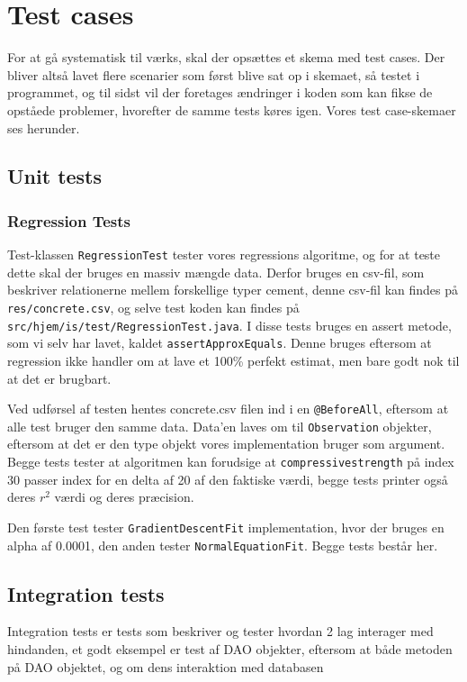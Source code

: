 \section{Test cases}
For at gå systematisk til værks, skal der opsættes et skema med test cases\cite{Heumann}. Der bliver altså lavet flere scenarier som først blive sat op i skemaet, så testet i programmet, og til sidst vil der foretages ændringer i koden som kan fikse de opståede problemer, hvorefter de samme tests køres igen. Vores test case-skemaer ses herunder.

\subsection{Unit tests}
\subsubsection{Regression Tests}
Test-klassen \texttt{RegressionTest} tester vores regressions algoritme, og for at teste dette skal der bruges en massiv mængde data. Derfor bruges en csv-fil, som beskriver relationerne mellem forskellige typer cement, denne csv-fil kan findes på \texttt{res/concrete.csv}, og selve test koden kan findes på \texttt{src/hjem/is/test/RegressionTest.java}. I disse tests bruges en assert metode, som vi selv har lavet, kaldet \texttt{assertApproxEquals}. Denne bruges eftersom at regression ikke handler om at lave et 100\% perfekt estimat, men bare godt nok til at det er brugbart.

Ved udførsel af testen hentes concrete.csv filen ind i en \texttt{@BeforeAll}, eftersom at alle test bruger den samme data. Data'en laves om til \texttt{Observation} objekter, eftersom at det er den type objekt vores implementation bruger som argument. Begge tests tester at algoritmen kan forudsige at \texttt{compressivestrength} på index 30 passer index for en delta af 20 af den faktiske værdi, begge tests printer også deres $r^{2}$ værdi og deres præcision.

Den første test tester \texttt{GradientDescentFit}\cite{GradientDescent} implementation, hvor der bruges en alpha af 0.0001, den anden tester \texttt{NormalEquationFit}\cite{NormalEquation}. Begge tests består her. 

\subsection{Integration tests}
Integration tests er tests som beskriver og tester hvordan 2 lag interager med hindanden, et godt eksempel er test af DAO objekter, eftersom at både metoden på DAO objektet, og om dens interaktion med databasen

